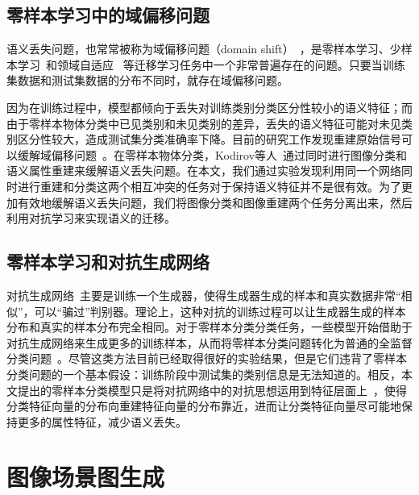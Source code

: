 \subsection{零样本学习中的域偏移问题}
语义丢失问题，也常常被称为域偏移问题（domain shift）~\cite{fu2015transductive,saenko2010adapting}，是零样本学习、少样本学习~\cite{hariharan2017low}和领域自适应~\cite{motiian2017unified,panareda2017open}
等迁移学习任务中一个非常普遍存在的问题。只要当训练集数据和测试集数据的分布不同时，就存在域偏移问题。

因为在训练过程中，模型都倾向于丢失对训练类别分类区分性较小的语义特征；而由于零样本物体分类中已见类别和未见类别的差异，丢失的语义特征可能对未见类别区分性较大，造成测试集分类准确率下降。目前的研究工作发现重建原始信号可以缓解域偏移问题~\cite{kim2017learning}。在零样本物体分类，Kodirov等人~\cite{kodirov2017semantic}通过同时进行图像分类和语义属性重建来缓解语义丢失问题。在本文，我们通过实验发现利用同一个网络同时进行重建和分类这两个相互冲突的任务对于保持语义特征并不是很有效。为了更加有效地缓解语义丢失问题，我们将图像分类和图像重建两个任务分离出来，然后利用对抗学习来实现语义的迁移。

\subsection{零样本学习和对抗生成网络}
对抗生成网络~\cite{goodfellow2014generative}主要是训练一个生成器，使得生成器生成的样本和真实数据非常“相似”，可以“骗过”判别器。理论上，这种对抗的训练过程可以让生成器生成的样本分布和真实的样本分布完全相同。对于零样本分类分类任务，一些模型开始借助于对抗生成网络来生成更多的训练样本，从而将零样本分类问题转化为普通的全监督分类问题~\cite{mishra2018generative,xian2018feature,xian2019f}。尽管这类方法目前已经取得很好的实验结果，但是它们违背了零样本分类问题的一个基本假设：训练阶段中测试集的类别信息是无法知道的。相反，本文提出的零样本分类模型只是将对抗网络中的对抗思想运用到特征层面上~\cite{odena2017conditional,tzeng2017adversarial,makhzani2015adversarial,shrivastava2017learning}，使得分类特征向量的分布向重建特征向量的分布靠近，进而让分类特征向量尽可能地保持更多的属性特征，减少语义丢失。


\section{图像场景图生成}


